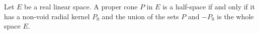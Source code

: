 Let $E$ be a real linear space. A proper cone $P$ in $E$ is a half-space if and only if it has a non-void radial kernel $P_0$ and the union of the sets $P$ and $-P_0$ is the whole space $E$.
